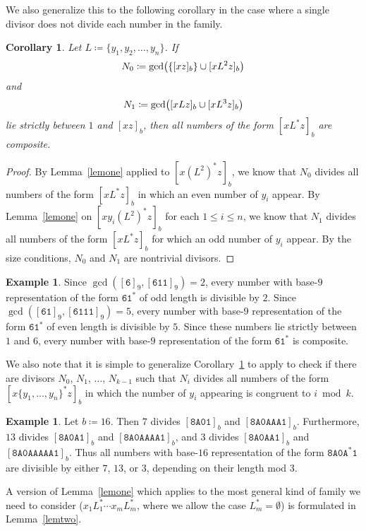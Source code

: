 \documentclass[12pt]{article}
\DeclarePairedDelimiter\paren{\lparen}{\rparen}
\theoremstyle{plain}
\newtheorem{corollary}[theorem]{Corollary}
\theoremstyle{definition}
\newtheorem{example}[theorem]{Example}
\newcommand{\0}{\mathtt{0}}
\newcommand{\1}{\mathtt{1}}
\newcommand{\2}{\mathtt{2}}
\newcommand{\3}{\mathtt{3}}
\newcommand{\4}{\mathtt{4}}
\newcommand{\5}{\mathtt{5}}
\newcommand{\6}{\mathtt{6}}
\newcommand{\7}{\mathtt{7}}
\newcommand{\8}{\mathtt{8}}
\newcommand{\9}{\mathtt{9}}
\newcommand{\A}{\mathtt{A}}
\newcommand{\union}{\cup}
\begin{document}
We also generalize this to the following corollary in the case where 
a single divisor does not divide each number in the family.
\begin{corollary}\label{cortwo}
Let\/ $L \coloneqq \lbrace y_1, y_2, \ldots, y_n \rbrace$.
If \[N_0\coloneqq\gcd \paren[\big]{ \{ [xz]_b \} \union [xL^2 z]_b} \]
and
\[ N_1\coloneqq \gcd \paren[\big]{[xLz]_b \union [xL^3z]_b} \]
lie strictly between\/ $1$ and\/ $[xz]_b$, then all numbers of the form\/ 
$[xL^*z]_b$ are composite.
\end{corollary}
\begin{proof}
By Lemma~\ref{lemone} applied
to $[x(L^2)^*z]_b$, we know that $N_0$ divides all numbers of the 
form $[x L^* z]_b$ in which an even number of $y_i$ appear.
By Lemma~\ref{lemone} on $[xy_i(L^2)^*z]_b$ 
for each $1\leq i\leq n$, we know that $N_1$ 
divides all numbers of the form $[x L^* z]_b$ for which an 
odd number of $y_i$ appear.
By the size conditions, $N_0$ and $N_1$ are nontrivial divisors.
\end{proof}

\begin{example}
Since $\gcd([\6]_9,[\6\1\1]_9)=2$, every number with
base-$9$ representation of the form $\6\1^*$ of 
odd length is divisible by $2$.
Since $\gcd([\6\1]_9,[\6\1\1\1]_9)=5$,
every number with base-$9$ representation of the form $\6\1^*$ 
of even length is divisible by $5$.  Since these numbers lie 
strictly between $1$ and $6$, every number with base-$9$
representation of the form $\6\1^*$ is 
composite.
\end{example}

We also note that it is simple to generalize Corollary~\ref{cortwo}
to apply to 
check if there are divisors $N_0$, $N_1$, $\dotsc$, $N_{k-1}$ such that
$N_i$ divides all numbers of the form $[x\{y_1,\dotsc,y_n\}^*z]_b$ in which 
the number of $y_i$ appearing is congruent to $i\bmod k$.
\begin{example}
Let $b \coloneqq 16$.
Then
$7$ divides $[\8\A\0\1]_b$ and $[\8\A\0\A\A\A\1]_b$.
Furthermore, $13$ divides 
$[\8\A\0\A\1]_b$ and $[\8\A\0\A\A\A\A\1]_b$,
and $3$ divides $[\8\A\0\A\A\1]_b$ and 
$[\8\A\0\A\A\A\A\A\1]_b$.  Thus all numbers with base-$16$
representation of the form $\8\A\0\A^*\1$ are 
divisible by either $7$, $13$, or $3$, depending on their 
length mod $3$.
\end{example}

A version of Lemma~\ref{lemone} which applies to the most general kind 
of family we need to consider ($x_1L_1^*\dotsm x_mL_m^*$, where we allow the case $L_m^*=\emptyset$)
is formulated in Lemma~\ref{lemtwo}.
\end{document}
